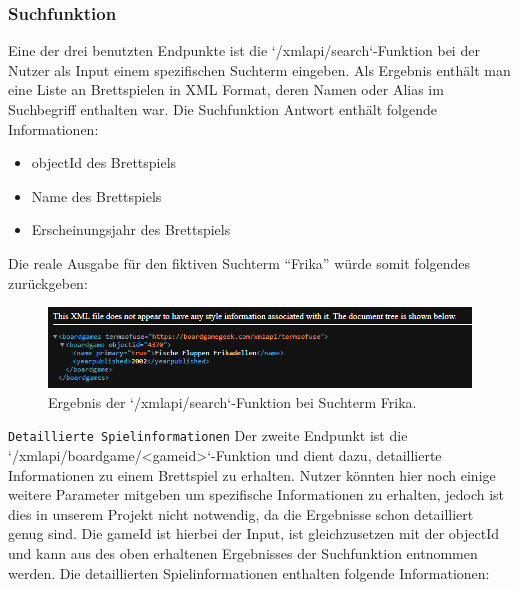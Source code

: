 \subsubsection{Suchfunktion}
Eine der drei benutzten Endpunkte ist die `/xmlapi/search`-Funktion bei der Nutzer als Input einem spezifischen Suchterm eingeben.
Als Ergebnis enthält man eine Liste an Brettspielen in XML Format, deren Namen oder Alias im Suchbegriff enthalten war.
Die Suchfunktion Antwort enthält folgende Informationen:
\begin{itemize}
    \item {objectId des Brettspiels}
    \item {Name des Brettspiels}
    \item {Erscheinungsjahr des Brettspiels}
\end{itemize}
Die reale Ausgabe für den fiktiven Suchterm ``Frika'' würde somit folgendes zurückgeben: 
\begin{figure}[h]
    \centering
    \includegraphics[width=1\textwidth]{graphics/Search_API.png}
    \caption{Ergebnis der `/xmlapi/search`-Funktion bei Suchterm Frika.}
    \label{fig:Search_API}
\end{figure}
\texttt{Detaillierte Spielinformationen}
Der zweite Endpunkt ist die `/xmlapi/boardgame/<gameid>`-Funktion und dient dazu,
detaillierte Informationen zu einem Brettspiel zu erhalten. Nutzer könnten hier noch einige weitere Parameter mitgeben um spezifische Informationen zu erhalten, jedoch ist dies in unserem Projekt nicht notwendig, da die Ergebnisse schon detailliert genug sind.
Die gameId ist hierbei der Input, ist gleichzusetzen mit der objectId und kann aus des oben erhaltenen Ergebnisses der Suchfunktion entnommen werden.
Die detaillierten Spielinformationen enthalten folgende Informationen:
